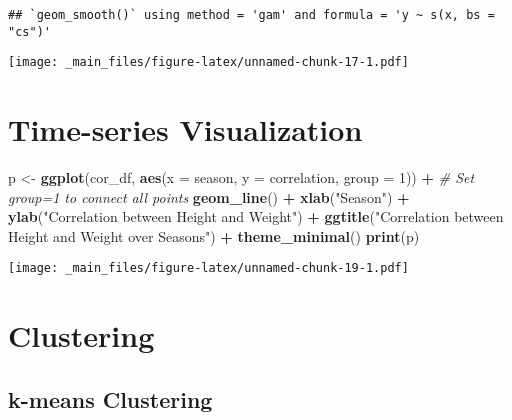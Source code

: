 \documentclass[
]{book}
\newenvironment{Shaded}{\begin{snugshade}}{\end{snugshade}}
\newcommand{\AttributeTok}[1]{\textcolor[rgb]{0.13,0.29,0.53}{#1}}
\newcommand{\CommentTok}[1]{\textcolor[rgb]{0.56,0.35,0.01}{\textit{#1}}}
\newcommand{\DecValTok}[1]{\textcolor[rgb]{0.00,0.00,0.81}{#1}}
\newcommand{\FunctionTok}[1]{\textcolor[rgb]{0.13,0.29,0.53}{\textbf{#1}}}
\newcommand{\NormalTok}[1]{#1}
\newcommand{\OtherTok}[1]{\textcolor[rgb]{0.56,0.35,0.01}{#1}}
\newcommand{\SpecialCharTok}[1]{\textcolor[rgb]{0.81,0.36,0.00}{\textbf{#1}}}
\newcommand{\StringTok}[1]{\textcolor[rgb]{0.31,0.60,0.02}{#1}}
\theoremstyle{definition}
\theoremstyle{definition}
\theoremstyle{definition}
\theoremstyle{definition}
\theoremstyle{remark}
\begin{document}
\begin{verbatim}
## `geom_smooth()` using method = 'gam' and formula = 'y ~ s(x, bs = "cs")'
\end{verbatim}

\texttt{[image: \_main\_files/figure-latex/unnamed-chunk-17-1.pdf]}

\hypertarget{time-series-visualization}{%
\section{Time-series Visualization}\label{time-series-visualization}}

\begin{Shaded}
\begin{Highlighting}[]
\NormalTok{p }\OtherTok{\textless{}{-}} \FunctionTok{ggplot}\NormalTok{(cor\_df, }\FunctionTok{aes}\NormalTok{(}\AttributeTok{x =}\NormalTok{ season, }\AttributeTok{y =}\NormalTok{ correlation, }\AttributeTok{group =} \DecValTok{1}\NormalTok{)) }\SpecialCharTok{+}  \CommentTok{\# Set group=1 to connect all points}
  \FunctionTok{geom\_line}\NormalTok{() }\SpecialCharTok{+}
  \FunctionTok{xlab}\NormalTok{(}\StringTok{"Season"}\NormalTok{) }\SpecialCharTok{+}
  \FunctionTok{ylab}\NormalTok{(}\StringTok{"Correlation between Height and Weight"}\NormalTok{) }\SpecialCharTok{+}
  \FunctionTok{ggtitle}\NormalTok{(}\StringTok{"Correlation between Height and Weight over Seasons"}\NormalTok{) }\SpecialCharTok{+}
  \FunctionTok{theme\_minimal}\NormalTok{()}
\FunctionTok{print}\NormalTok{(p)}
\end{Highlighting}
\end{Shaded}

\texttt{[image: \_main\_files/figure-latex/unnamed-chunk-19-1.pdf]}

\hypertarget{clustering}{%
\section{Clustering}\label{clustering}}

\hypertarget{k-means-clustering}{%
\subsection{k-means Clustering}\label{k-means-clustering}}
\end{document}
